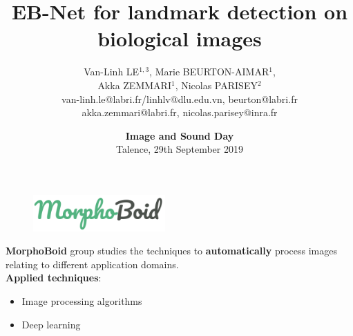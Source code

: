 \documentclass[10pt,svgnames]{beamer}
\title[Journée Image et Son] %
{ %
      \textbf{EB-Net  for landmark detection on biological images}
}
\author[V.L. Le, M. Beurton-Aimar, A. Zemmari, N. Parisey]
{      Van-Linh LE$^{1,3}$, Marie BEURTON-AIMAR$^{1}$,\\ Akka ZEMMARI$^{1}$, Nicolas PARISEY$^{2}$ \\[0.4cm]
      {\ttfamily\footnotesize{van-linh.le@labri.fr/linhlv@dlu.edu.vn, beurton@labri.fr\\
		akka.zemmari@labri.fr, nicolas.parisey@inra.fr \\    }
      }
}
\institute[]
{
      $^1$LaBRI-CNRS 5800, Bordeaux University, France\\
      $^2$IGEPP, INRA 1349 Rennes, France\\
      $^3$ITDLU, Dalat University, Vietnam
  
}
\date[I&S-2019]{\textbf{Image and Sound Day}\\Talence, 29th September 2019}
\begin{document}
{\morphoboid%
\begin{frame}
	\begin{figure}[!h]
		\centering
		\includegraphics[width=0.45\textwidth]{images/group}
	\end{figure}
	\textbf{MorphoBoid} group studies the techniques to \textbf{automatically} process images relating to different application domains. \\[0.3cm]
\textbf{Applied techniques}:
\begin{itemize}
	\item Image processing algorithms
	\item Deep learning
\end{itemize}


\end{frame}}
\end{document}
